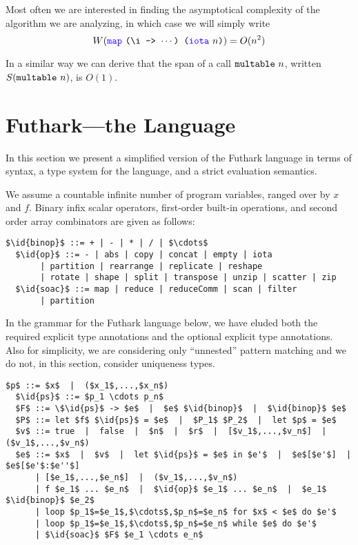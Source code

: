 \documentclass[oneside,11pt]{book}
\begin{document}
\noindent
Most often we are interested in finding the asymptotical complexity of
the algorithm we are analyzing, in which case we will simply write
$$W(\fop{map}~\kw{(\textbackslash{}i -> $\cdots$) (}\fop{iota}~\kw{$n$)}) = O(n^2) $$

In a similar way we can derive that the span of a call
$\texttt{multable}~n$, written $S(\texttt{multable}~n)$, is $O(1)$.


\section{Futhark---the Language}

In this section we present a simplified version of the Futhark
language in terms of syntax, a type system for the language, and a
strict evaluation semantics.

We assume a countable infinite number of program variables, ranged over
by $x$ and $f$. Binary infix scalar operators, first-order built-in operations, and
second order array combinators are given as follows:

\begin{lstlisting}[mathescape=true,style=nonumbers]
  $\id{binop}$ ::= + | - | * | / | $\cdots$
  $\id{op}$ ::= - | abs | copy | concat | empty | iota
       | partition | rearrange | replicate | reshape
       | rotate | shape | split | transpose | unzip | scatter | zip
  $\id{soac}$ ::= map | reduce | reduceComm | scan | filter
       | partition
\end{lstlisting}

In the grammar for the Futhark language below, we have eluded both the
required explicit type annotations and the optional explicit type
annotations. Also for simplicity, we are considering only ``unnested''
pattern matching and we do not, in this section, consider uniqueness types.

\begin{lstlisting}[mathescape=true,style=nonumbers]
  $p$ ::= $x$  |  ($x_1$,...,$x_n$)
  $\id{ps}$ ::= $p_1 \cdots p_n$
  $F$ ::= \$\id{ps}$ -> $e$  |  $e$ $\id{binop}$  |  $\id{binop}$ $e$
  $P$ ::= let $f$ $\id{ps}$ = $e$  |  $P_1$ $P_2$  |  let $p$ = $e$
  $v$ ::= true  |  false  |  $n$  |  $r$  |  [$v_1$,...,$v_n$]  |  ($v_1$,...,$v_n$)
  $e$ ::= $x$  |  $v$  |  let $\id{ps}$ = $e$ in $e'$  |  $e$[$e'$]  |  $e$[$e'$:$e''$]
      | [$e_1$,...,$e_n$]  |  ($v_1$,...,$v_n$)
      | f $e_1$ ... $e_n$  |  $\id{op}$ $e_1$ ... $e_n$  |  $e_1$ $\id{binop}$ $e_2$
      | loop $p_1$=$e_1$,$\cdots$,$p_n$=$e_n$ for $x$ < $e$ do $e'$
      | loop $p_1$=$e_1$,$\cdots$,$p_n$=$e_n$ while $e$ do $e'$
      | $\id{soac}$ $F$ $e_1 \cdots e_n$
\end{lstlisting}
\end{document}
